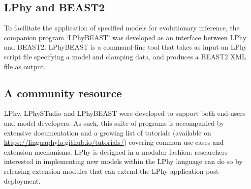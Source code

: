 \documentclass[10pt,letterpaper,table]{article}
\begin{document}
\subsection{LPhy and BEAST2}
\label{sec:lphybeast}
To facilitate the application of specified models for evolutionary inference, the companion program `LPhyBEAST' was developed as an interface between LPhy and BEAST2.
LPhyBEAST is a command-line tool that takes as input an LPhy script file specifying a model and clamping data, and produces a BEAST2 XML file as output.

\subsection{A community resource}
LPhy, LPhySTudio and LPhyBEAST were developed to support both end-users and model developers.
As such, this suite of programs is accompanied by extensive documentation and a growing list of tutorials (available on \url{https://linguaphylo.github.io/tutorials/}) covering common use cases and extension mechanisms.
LPhy is designed in a modular fashion: researchers interested in implementing new models within the LPhy language can do so by releasing extension modules that can extend the LPhy application post-deployment.


\end{document}
